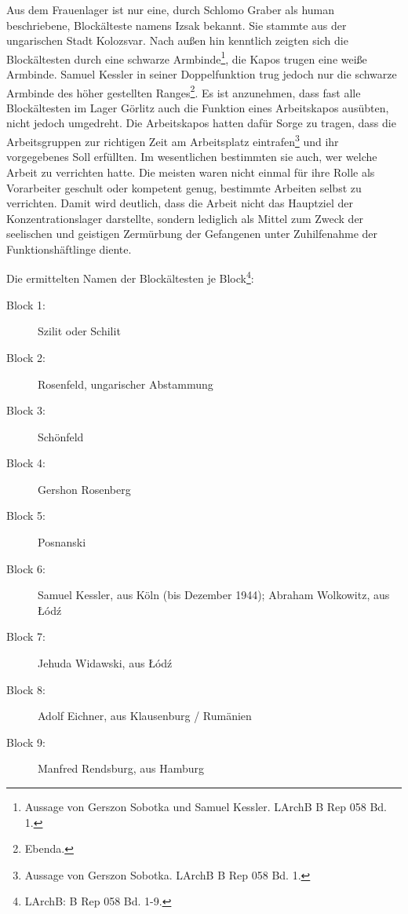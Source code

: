 \documentclass[a4paper,12pt,ngerman,
]{nisebook}
\begin{document}
Aus dem Frauenlager ist nur eine, durch Schlomo Graber als human beschriebene, Blockälteste namens Izsak bekannt. Sie stammte aus der ungarischen Stadt Kolozsvar.
\newline
Nach außen hin kenntlich zeigten sich die Blockältesten durch eine schwarze Armbinde\footnote{Aussage von Gerszon Sobotka und Samuel Kessler. LArchB B Rep 058 Bd. 1.}, die Kapos trugen eine weiße Armbinde. Samuel Kessler in seiner Doppelfunktion trug jedoch nur die schwarze Armbinde des höher gestellten Ranges\footnote{Ebenda.}.
\newline
Es ist anzunehmen, dass fast alle Blockältesten im Lager Görlitz auch die Funktion eines Arbeitskapos ausübten, nicht jedoch umgedreht. Die Arbeitskapos hatten dafür Sorge zu tragen, dass die Arbeitsgruppen zur richtigen Zeit am Arbeitsplatz eintrafen\footnote{Aussage von Gerszon Sobotka. LArchB B Rep 058 Bd. 1.} und ihr vorgegebenes Soll erfüllten. Im wesentlichen bestimmten sie auch, wer welche Arbeit zu verrichten hatte. Die meisten waren nicht einmal für ihre Rolle als Vorarbeiter geschult oder kompetent genug, bestimmte Arbeiten selbst zu verrichten. Damit wird deutlich, dass die Arbeit nicht das Hauptziel der Konzentrationslager darstellte, sondern lediglich als Mittel zum Zweck der seelischen und geistigen Zermürbung der Gefangenen unter Zuhilfenahme der Funktionshäftlinge diente.

Die ermittelten Namen der Blockältesten je Block\footnote{LArchB: B Rep 058 Bd. 1-9.}:

\begin{description} \item[Block 1:] Szilit oder Schilit
	\item[Block 2:] Rosenfeld, ungarischer Abstammung
	\item[Block 3:] Schönfeld
	\item[Block 4:] Gershon Rosenberg
	\item[Block 5:] Posnanski
	\item[Block 6:] Samuel Kessler, aus Köln (bis Dezember 1944); Abraham Wolkowitz, aus \L \'od\'z
	\item[Block 7:] Jehuda Widawski, aus \L \'od\'z
	\item[Block 8:] Adolf Eichner, aus Klausenburg / Rumänien
	\item[Block 9:] Manfred Rendsburg, aus Hamburg
\end{description}
\label{blockaeltesten}
\end{document}
